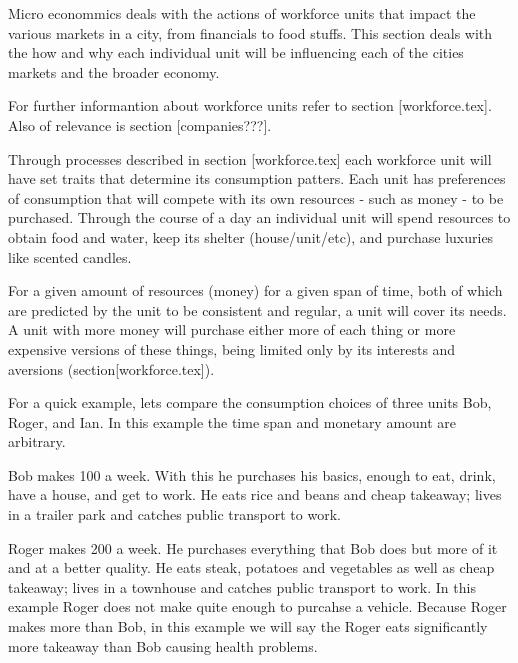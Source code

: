 


Micro econommics deals with the actions of workforce units that impact the various markets in a city, from financials to food stuffs. This section deals with the how and why each individual unit will be influencing each of the cities markets and the broader economy.

For further informantion about workforce units refer to section [workforce.tex]. Also of relevance is section [companies???].


Through processes described in section [workforce.tex] each workforce unit will have set traits that determine its consumption patters. Each unit has preferences of consumption that will compete with its own resources - such as money - to be purchased. Through the course of a day an individual unit will spend resources to obtain food and water, keep its shelter (house/unit/etc), and purchase luxuries like scented candles.



For a given amount of resources (money) for a given span of time, both of which are predicted by the unit to be consistent and regular, a unit will cover its needs. A unit with more money will purchase either more of each thing or more expensive versions of these things, being limited only by its interests and aversions (section[workforce.tex]).

For a quick example, lets compare the consumption choices of three units Bob, Roger, and Ian. In this example the time span and monetary amount are arbitrary. 

Bob makes 100 a week. With this he purchases his basics, enough to eat, drink, have a house, and get to work. He eats rice and beans and cheap takeaway; lives in a trailer park and catches public transport to work. 

Roger makes 200 a week. He purchases everything that Bob does but more of it and at a better quality. He eats steak, potatoes and vegetables as well as cheap takeaway; lives in a townhouse and catches public transport to work. In this example Roger does not make quite enough to purcahse a vehicle. Because Roger makes more than Bob, in this example we will say the Roger eats significantly more takeaway than Bob causing health problems.

